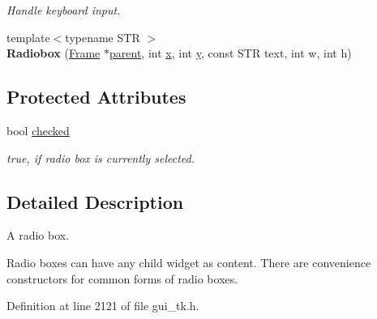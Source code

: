\begin{DoxyCompactItemize}
\begin{DoxyCompactList}\small\item\em Handle keyboard input. \end{DoxyCompactList}\item 
\hypertarget{classGUI_1_1Radiobox_a1043df1e70f217de9e5e61563f5d8ef1}{{\footnotesize template$<$typename S\-T\-R $>$ }\\{\bfseries Radiobox} (\hyperlink{classGUI_1_1Frame}{Frame} $\ast$\hyperlink{classGUI_1_1Window_a2e593ff65e7702178d82fe9010a0b539}{parent}, int \hyperlink{classGUI_1_1Window_a6ca6a80ca00c9e1d8ceea8d3d99a657d}{x}, int \hyperlink{classGUI_1_1Window_a0ee8e923aff2c3661fc2e17656d37adf}{y}, const S\-T\-R text, int w, int h)}\label{classGUI_1_1Radiobox_a1043df1e70f217de9e5e61563f5d8ef1}

\end{DoxyCompactItemize}
\subsection*{Protected Attributes}
\begin{DoxyCompactItemize}
\item 
\hypertarget{classGUI_1_1Radiobox_ace7ecfe96f9746040c020362d13d7046}{bool \hyperlink{classGUI_1_1Radiobox_ace7ecfe96f9746040c020362d13d7046}{checked}}\label{classGUI_1_1Radiobox_ace7ecfe96f9746040c020362d13d7046}

\begin{DoxyCompactList}\small\item\em {\ttfamily true}, if radio box is currently selected. \end{DoxyCompactList}\end{DoxyCompactItemize}


\subsection{Detailed Description}
A radio box. 

Radio boxes can have any child widget as content. There are convenience constructors for common forms of radio boxes. 

Definition at line 2121 of file gui\-\_\-tk.\-h.



